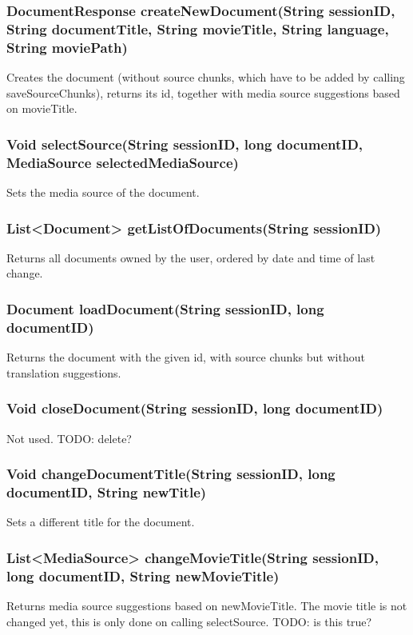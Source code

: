 \subsubsection{DocumentResponse createNewDocument(String sessionID, String documentTitle, String movieTitle, String language, String moviePath)}

Creates the document
(without source chunks, which have to be added by calling saveSourceChunks),
returns its id, together with media source suggestions based on movieTitle.
     	
\subsubsection{Void selectSource(String sessionID, long documentID, MediaSource selectedMediaSource)}
Sets the media source of the document.

\subsubsection{List<Document> getListOfDocuments(String sessionID)}
Returns all documents owned by the user, ordered by date and time of last change.

\subsubsection{Document loadDocument(String sessionID, long documentID)}
Returns the document with the given id, with source chunks but without translation suggestions.

\subsubsection{Void closeDocument(String sessionID, long documentID)}
Not used. TODO: delete?
     	
\subsubsection{Void changeDocumentTitle(String sessionID, long documentID, String newTitle)}
Sets a different title for the document.
     	
\subsubsection{List<MediaSource> changeMovieTitle(String sessionID, long documentID, String newMovieTitle)}
Returns media source suggestions based on newMovieTitle.
The movie title is not changed yet,
this is only done on calling selectSource.
TODO: is this true?     	 
     	

